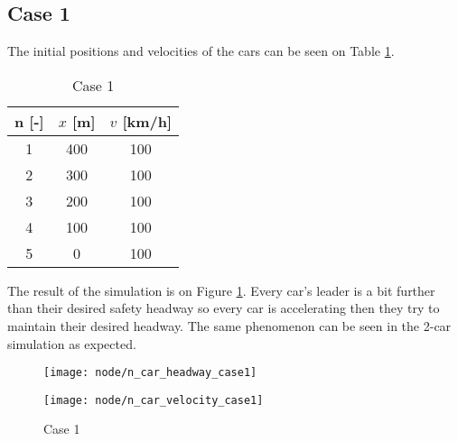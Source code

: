 		\subsection*{Case 1}
		The initial positions and velocities of the cars can be seen on Table \ref{tab:node_case1}.
		\begin{table}
			\centering
			\begin{tabular}{ |c|c|c| }
				\hline
				n [-] & $x$ [m] & $v$ [km/h]\\
				\hline
				1 & 400 & 100 \\
				2 & 300 & 100 \\
				3 & 200 & 100 \\
				4 & 100 & 100 \\
				5 & 0 & 100 \\
				\hline
			\end{tabular}
			\caption{Case 1}
			\label{tab:node_case1}
		\end{table}
		The result of the simulation is on Figure \ref{fig:node_case1}. Every car's leader is a bit further than their desired safety headway so every car is accelerating then they try to maintain their desired headway. The same phenomenon can be seen in the 2-car simulation as expected.
		\begin{figure}
			\centering
			\begin{minipage}{.5\textwidth}
				\centering
				\texttt{[image: node/n\_car\_headway\_case1]}
			\end{minipage}\hfill
			\begin{minipage}{.5\textwidth}
				\centering
				\texttt{[image: node/n\_car\_velocity\_case1]}
			\end{minipage}
			\caption{Case 1}
			\label{fig:node_case1}
		\end{figure}
